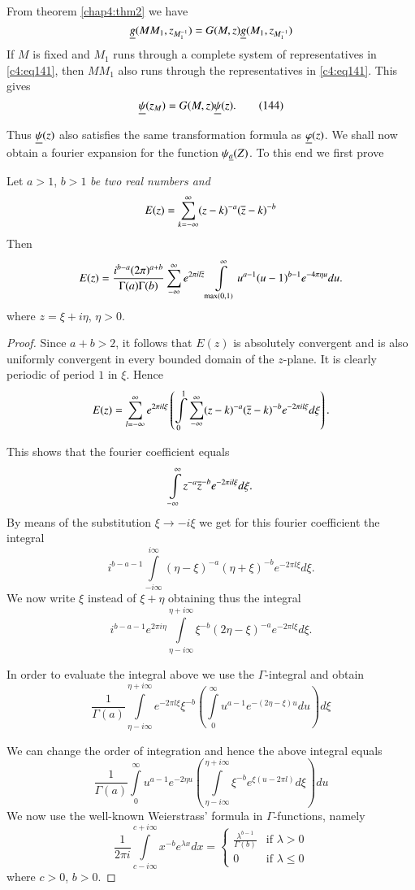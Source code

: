 From theorem \ref{chap4:thm2} we have
$$
\underline{g}(MM_{1},z_{M_{1}^{-1}})=G(M,z)\underline{g}(M_{1},z_{M_{1}^{-1}})
$$
If $M$ is fixed and $M_{1}$ runs through a complete system of
representatives in \eqref{c4:eq141}, then $MM_{1}$ also runs through the
representatives in \eqref{c4:eq141}. This gives
\begin{equation*}
\underline{\psi}(z_{M})=G(M,z)\underline{\psi}(z).\tag{144}\label{c4:eq144}
\end{equation*}

Thus $\underline{\psi}(z)$ also satisfies the same transformation formula as
$\underline{\varphi}(z)$. We shall now obtain a fourier expansion for the
function $\psi_{\underline{a}}(Z)$. To this end we first prove

\begin{lem}\label{chap4:lem4}
Let $a>1$, $b>1$ {\em be two real numbers and}
$$
E(z)=\sum^{\infty}_{k=-\infty}(z-k)^{-a}(\overline{z}-k)^{-b}
$$
Then 
$$
E(z)=\frac{i^{b-a}(2\pi)^{a+b}}{\Gamma(a)\Gamma(b)}\sum^{\infty}_{-\infty}
e^{2\pi il\overline{z}} \int\limits^{\infty}_{\max(0,1)}u^{a-1}(u-1)^{b-1}e^{-4\pi
  \eta u}du.
$$\pageoriginale
where $z=\xi+i\eta$, $\eta>0$.
\end{lem}

\begin{proof}
Since $a+b>2$, it follows that $E(z)$ is absolutely convergent and is
also uniformly convergent in every bounded domain of the $z$-plane. It
is clearly periodic of period $1$ in $\xi$. Hence
$$
E(z)=\sum^{\infty}_{l=-\infty}e^{2\pi i
  l\xi}\left(\int\limits^{1}_{0}\sum^{\infty}_{-\infty}(z-k)^{-a}(\overline{z}-k)^{-b}e^{-2\pi
  il\xi}d\xi\right). 
$$

This shows that the fourier coefficient equals
$$
\int\limits^{\infty}_{-\infty}z^{-a}\overline{z}^{-b}e^{-2\pi il\xi}d\xi.
$$
By means of the substitution $\xi\to -i\xi$ we get for this fourier
coefficient the integral
$$
i^{b-a-1}\int\limits^{i\infty}_{-i\infty}(\eta-\xi)^{-a}(\eta+\xi)^{-b}e^{-2\pi
  l \xi}d\xi. 
$$
We now write $\xi$ instead of $\xi+\eta$ obtaining thus the integral
$$
i^{b-a-1}e^{2\pi
  i\eta}\int\limits^{\eta+i\infty}_{\eta - i\infty}\xi^{-b}(2\eta-\xi)^{-a}e^{-2\pi
  l\xi}d\xi. 
$$

In order to evaluate the integral above we use the $\Gamma$-integral
and obtain 
\begin{equation*}
\frac{1}{\Gamma(a)}\int\limits^{\eta+i\infty}_{\eta-i\infty}e^{-2\pi
  l\xi}\xi^{-b}\left(\int\limits^{\infty}_{0}u^{a-1}e^{-(2\eta-\xi)u}du\right)d\xi
\tag{145}\label{c4:eq145} 
\end{equation*}

We can change the order of integration and hence the above integral
equals 
$$ 
\frac{1}{\Gamma(a)}\int\limits^{\infty}_{0}u^{a-1}
e^{-2\eta u} \left(\int\limits^{\eta+i\infty}_{\eta-i\infty}\xi^{-b}e^{\xi(u-2\pi
  l)}d\xi\right)du
$$\pageoriginale
We now use the well-known Weierstrass' formula in $\Gamma$-functions,\break
namely
$$
\frac{1}{2\pi i}\int\limits^{c+i\infty}_{c-i\infty}x^{-b}e^{\lambda
  x}dx=
\begin{cases}
\frac{\lambda^{b-1}}{\Gamma(b)} & \text{if } \lambda>0\\
0 & \text{if } \lambda\leq 0
\end{cases}
$$
where $c>0$, $b>0$.
\end{proof}

